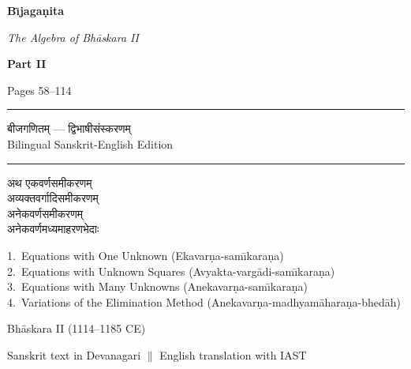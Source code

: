 \documentclass[11pt,a4paper]{article}
\begin{document}
\begin{titlepage}
\centering
\vspace*{1.5cm}

{\Huge\bfseries\color{titlecolor} B\={\i}jaga\d{n}ita\par}
\vspace{0.3cm}
{\Large\itshape The Algebra of Bh\={a}skara II\par}

\vspace{1cm}
{\LARGE\bfseries\color{sectioncolor} Part II\par}
\vspace{0.2cm}
{\large Pages 58--114\par}

\vspace{1.5cm}

\begin{center}
\rule{0.6\textwidth}{1pt}
\end{center}

\vspace{0.3cm}
{\large\devanagarifont
बीजगणितम् — द्विभाषीसंस्करणम्\\[0.3em]
Bilingual Sanskrit-English Edition\par}

\vspace{0.3cm}
\begin{center}
\rule{0.6\textwidth}{1pt}
\end{center}

\vspace{1cm}

{\large\devanagarifont
अथ एकवर्णसमीकरणम्\\
अव्यक्तवर्गादिसमीकरणम्\\
अनेकवर्णसमीकरणम्\\[0.5em]
अनेकवर्णमध्यमाहरणभेदाः\par}

\vspace{0.5cm}
{\normalsize
1.~Equations with One Unknown (Ekavar\d{n}a-sam\={\i}kara\d{n}a)\\
2.~Equations with Unknown Squares (Avyakta-varg\={a}di-sam\={\i}kara\d{n}a)\\
3.~Equations with Many Unknowns (Anekavar\d{n}a-sam\={\i}kara\d{n}a)\\
4.~Variations of the Elimination Method (Anekavar\d{n}a-madhyam\={a}hara\d{n}a-bhed\={a}h)\par}

\vfill

{\large Bh\={a}skara II (1114--1185 CE)\par}
\vspace{0.3cm}
{\small Sanskrit text in Devanagari $\parallel$ English translation with IAST\par}

\end{titlepage}
\end{document}
